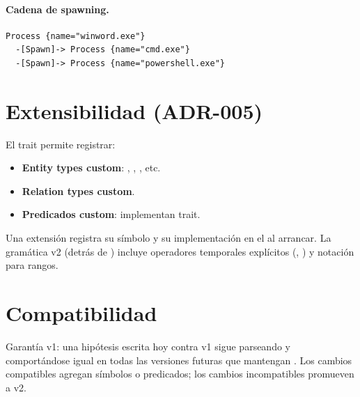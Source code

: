 \paragraph{Cadena de spawning.}
\begin{lstlisting}[basicstyle=\ttfamily\small]
Process {name="winword.exe"}
  -[Spawn]-> Process {name="cmd.exe"}
  -[Spawn]-> Process {name="powershell.exe"}
\end{lstlisting}

\section{Extensibilidad (ADR-005)}

El trait  permite registrar:

\begin{itemize}
    \item \textbf{Entity types custom}: ,
    , , etc.
    \item \textbf{Relation types custom}.
    \item \textbf{Predicados custom}: implementan
     trait.
\end{itemize}

Una extensión registra su símbolo y su implementación en el
 al arrancar. La gramática v2 (detrás de
) incluye operadores
temporales explícitos (, ) y notación
para rangos.

\section{Compatibilidad}

Garantía v1: una hipótesis escrita hoy contra v1 sigue parseando y
comportándose igual en todas las versiones futuras que mantengan
. Los cambios compatibles agregan símbolos o
predicados; los cambios incompatibles promueven a v2.
